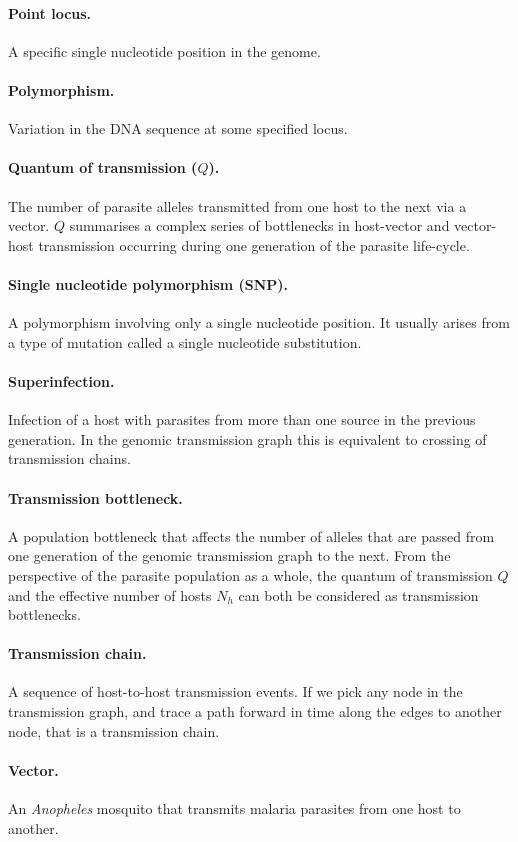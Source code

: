 \documentclass[_main.tex]{subfiles}
\begin{document}
\paragraph{Point locus.}  A specific single nucleotide position in the genome. 

\paragraph{Polymorphism.} Variation in the DNA sequence at some specified locus.

\paragraph{Quantum of transmission ($Q$).} The number of parasite alleles transmitted from one host to the next via a vector.  $Q$ summarises a complex series of bottlenecks in host-vector and vector-host transmission occurring during one generation of the parasite life-cycle.

\paragraph{Single nucleotide polymorphism (SNP).}  A polymorphism involving only a single nucleotide position.  It usually arises from a type of mutation called a single nucleotide substitution.

\paragraph{Superinfection.}  Infection of a host with parasites from more than one source in the previous generation.  In the genomic transmission graph this is equivalent to crossing of transmission chains.

\paragraph{Transmission bottleneck.}  A population bottleneck that affects the number of alleles that are passed from one generation of the genomic transmission graph to the next.  From the perspective of the parasite population as a whole, the quantum of transmission $Q$ and the effective number of hosts $N_h$ can both be considered as transmission bottlenecks.

\paragraph{Transmission chain.}  A sequence of host-to-host transmission events.   If we pick any node in the transmission graph, and trace a path forward in time along the edges to another node, that is a transmission chain.

\paragraph{Vector.}  An \textit{Anopheles} mosquito that transmits malaria parasites from one host to another. 
\end{document}
